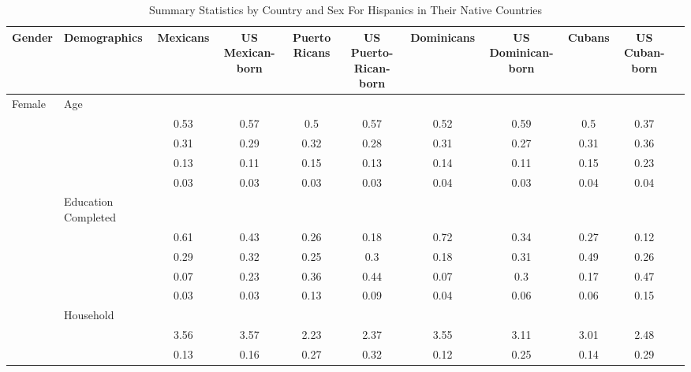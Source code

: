 \documentclass[
]{article}
\begin{document}
\begin{landscape}
\begin{table}[ht]
\centering
\caption{Summary Statistics by Country and Sex For Hispanics in Their Native Countries} 
\begingroup\small
\begin{tabular}{l|>{\raggedright\arraybackslash}p{3.2cm}|ccccccccc}
  \hline
Gender & Demographics & Mexicans & US Mexican-born & Puerto Ricans & US Puerto-Rican-born & Dominicans & US Dominican-born & Cubans & US Cuban-born \\ 
  \hline
Female & Age &  &  &  &  &  &  &  &  \\ 
   & \multicolumn{1}{>{\raggedleft\arraybackslash}p{1.5cm}|}{\makebox[1.5cm][r]{60 - 69 }} & 0.53 & 0.57 & 0.5 & 0.57 & 0.52 & 0.59 & 0.5 & 0.37 \\ 
   & \multicolumn{1}{>{\raggedleft\arraybackslash}p{1.5cm}|}{\makebox[1.5cm][r]{70 - 79 }} & 0.31 & 0.29 & 0.32 & 0.28 & 0.31 & 0.27 & 0.31 & 0.36 \\ 
   & \multicolumn{1}{>{\raggedleft\arraybackslash}p{1.5cm}|}{\makebox[1.5cm][r]{80 - 89 }} & 0.13 & 0.11 & 0.15 & 0.13 & 0.14 & 0.11 & 0.15 & 0.23 \\ 
   & \multicolumn{1}{>{\raggedleft\arraybackslash}p{1.5cm}|}{\makebox[1.5cm][r]{90 plus }} & 0.03 & 0.03 & 0.03 & 0.03 & 0.04 & 0.03 & 0.04 & 0.04 \\ 
   & Education Completed &  &  &  &  &  &  &  &  \\ 
   & \multicolumn{1}{>{\raggedleft\arraybackslash}p{3.2cm}|}{\makebox[3.2cm][r]{Less than Primary }} & 0.61 & 0.43 & 0.26 & 0.18 & 0.72 & 0.34 & 0.27 & 0.12 \\ 
   & \multicolumn{1}{>{\raggedleft\arraybackslash}p{1.7cm}|}{\makebox[1.7cm][r]{Primary }} & 0.29 & 0.32 & 0.25 & 0.3 & 0.18 & 0.31 & 0.49 & 0.26 \\ 
   & \multicolumn{1}{>{\raggedleft\arraybackslash}p{2cm}|}{\makebox[2cm][r]{Secondary }} & 0.07 & 0.23 & 0.36 & 0.44 & 0.07 & 0.3 & 0.17 & 0.47 \\ 
   & \multicolumn{1}{>{\raggedleft\arraybackslash}p{2cm}|}{\makebox[2cm][r]{University }} & 0.03 & 0.03 & 0.13 & 0.09 & 0.04 & 0.06 & 0.06 & 0.15 \\ 
   & Household &  &  &  &  &  &  &  &  \\ 
   & \multicolumn{1}{>{\raggedleft\arraybackslash}p{2.7cm}|}{\makebox[2.7cm][r]{Household Size }} & 3.56 & 3.57 & 2.23 & 2.37 & 3.55 & 3.11 & 3.01 & 2.48 \\ 
   & \multicolumn{1}{>{\raggedleft\arraybackslash}p{2.2cm}|}{\makebox[2.2cm][r]{Lives Alone }} & 0.13 & 0.16 & 0.27 & 0.32 & 0.12 & 0.25 & 0.14 & 0.29 \\ 

\end{tabular}
\end{table}
\end{landscape}
\end{document}
